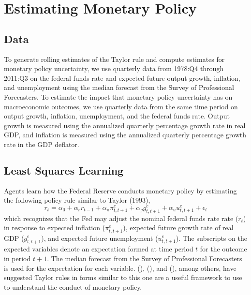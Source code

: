 \documentclass[12pt]{article}
\newcommand{\beq}{\begin{equation}}
\newcommand{\eeq}{\end{equation}}
\newcommand{\citee}[1]{\citename{#1} (\citeyear{#1})}
\begin{document}
\section{Estimating Monetary Policy}
\subsection{Data}
To generate rolling estimates of the Taylor rule and compute estimates for monetary policy uncertainty, we use quarterly data from 1978:Q4 through 2011:Q3 on the federal funds rate and expected future output growth, inflation, and unemployment using the median forecast from the Survey of Professional Forecasters.  To estimate the impact that monetary policy uncertainty has on macroeconomic outcomes, we use quarterly data from the same time period on output growth, inflation, unemployment, and the federal funds rate.  Output growth is measured using the annualized quarterly percentage growth rate in real GDP, and inflation is measured using the annualized quarterly percentage growth rate in the GDP deflator.  

\subsection{Least Squares Learning}
Agents learn how the Federal Reserve conducts monetary policy by estimating the following policy rule similar to Taylor (1993),
\beq \label{eq:taylor} r_t = \alpha_0 + \alpha_r r_{t-1} + \alpha_{\pi} \pi_{t,t+1}^e + \alpha_g g_{t,t+1}^e + \alpha_u u_{t,t+1}^e + \epsilon_t \eeq
which recognizes that the Fed may adjust the nominal federal funds rate rate ($r_t$) in response to expected inflation ($\pi_{t,t+1}^e$), expected future growth rate of real GDP ($g_{t,t+1}^e$), and expected future unemployment ($u_{t,t+1}^e$).  The subscripts on the expected variables denote an expectation formed at time period $t$ for the outcome in period $t+1$.  The median forecast from the Survey of Professional Forecasters is used for the expectation for each variable.  \citee{juddrude}, \citee{taylor1999}, and \citee{orphanides2003}, among others, have suggested Taylor rules in forms similar to this one are a useful framework to use to understand the conduct of monetary policy.  
\end{document}
